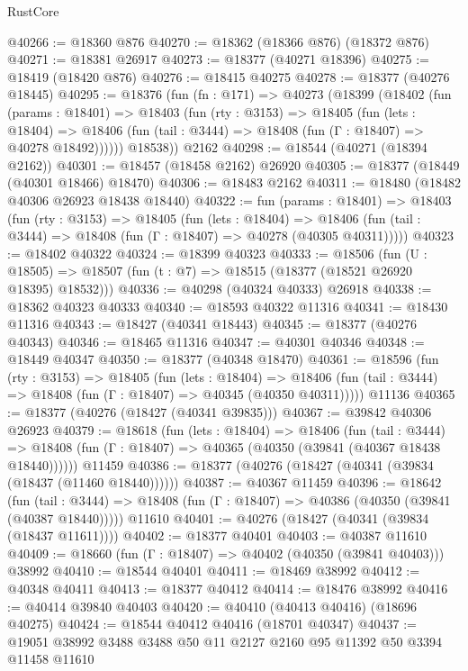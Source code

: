 \begin{lexlean}{RustCore}
\begin{coremodule}
@40266 := @18360 @876
@40270 := @18362 (@18366 @876) (@18372 @876)
@40271 := @18381 @26917
@40273 := @18377 (@40271 @18396)
@40275 := @18419 (@18420 @876)
@40276 := @18415 @40275
@40278 := @18377 (@40276 @18445)
@40295 := @18376
    (fun (fn : @171) =>
    @40273
      (@18399
        (@18402
          (fun (params : @18401) =>
          @18403
            (fun (rty : @3153) =>
            @18405
              (fun (lets : @18404) =>
              @18406 (fun (tail : @3444) => @18408 (fun (Γ : @18407) => @40278 @18492))))))
        @18538))
    @2162
@40298 := @18544 (@40271 (@18394 @2162))
@40301 := @18457 (@18458 @2162) @26920
@40305 := @18377 (@18449 (@40301 @18466) @18470)
@40306 := @18483 @2162
@40311 := @18480 (@18482 @40306 @26923 @18438 @18440)
@40322 := fun (params : @18401) =>
  @18403
    (fun (rty : @3153) =>
    @18405
      (fun (lets : @18404) =>
      @18406 (fun (tail : @3444) => @18408 (fun (Γ : @18407) => @40278 (@40305 @40311)))))
@40323 := @18402 @40322
@40324 := @18399 @40323
@40333 := @18506
    (fun (U : @18505) => @18507 (fun (t : @7) => @18515 (@18377 (@18521 @26920 @18395) @18532)))
@40336 := @40298 (@40324 @40333) @26918
@40338 := @18362 @40323 @40333
@40340 := @18593 @40322 @11316
@40341 := @18430 @11316
@40343 := @18427 (@40341 @18443)
@40345 := @18377 (@40276 @40343)
@40346 := @18465 @11316
@40347 := @40301 @40346
@40348 := @18449 @40347
@40350 := @18377 (@40348 @18470)
@40361 := @18596
    (fun (rty : @3153) =>
    @18405
      (fun (lets : @18404) =>
      @18406 (fun (tail : @3444) => @18408 (fun (Γ : @18407) => @40345 (@40350 @40311)))))
    @11136
@40365 := @18377 (@40276 (@18427 (@40341 @39835)))
@40367 := @39842 @40306 @26923
@40379 := @18618
    (fun (lets : @18404) =>
    @18406
      (fun (tail : @3444) =>
      @18408 (fun (Γ : @18407) => @40365 (@40350 (@39841 (@40367 @18438 @18440))))))
    @11459
@40386 := @18377 (@40276 (@18427 (@40341 (@39834 (@18437 (@11460 @18440))))))
@40387 := @40367 @11459
@40396 := @18642
    (fun (tail : @3444) => @18408 (fun (Γ : @18407) => @40386 (@40350 (@39841 (@40387 @18440)))))
    @11610
@40401 := @40276 (@18427 (@40341 (@39834 (@18437 @11611))))
@40402 := @18377 @40401
@40403 := @40387 @11610
@40409 := @18660 (fun (Γ : @18407) => @40402 (@40350 (@39841 @40403))) @38992
@40410 := @18544 @40401
@40411 := @18469 @38992
@40412 := @40348 @40411
@40413 := @18377 @40412
@40414 := @18476 @38992
@40416 := @40414 @39840 @40403
@40420 := @40410 (@40413 @40416) (@18696 @40275)
@40424 := @18544 @40412 @40416 (@18701 @40347)
@40437 := @19051 @38992 @3488 @3488 @50 @11 @2127 @2160 @95 @11392 @50 @3394 @11458 @11610

\end{coremodule}
\end{lexlean}

